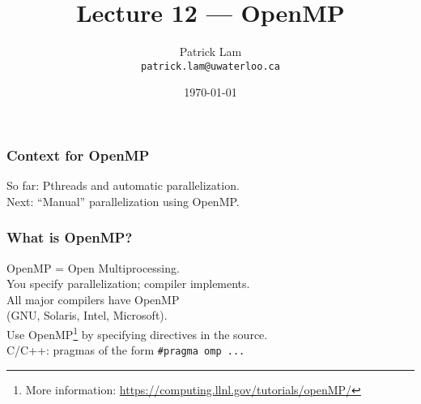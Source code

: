 

\title{Lecture 12 --- OpenMP }

\author{Patrick Lam \\ \small \texttt{patrick.lam@uwaterloo.ca}}
\date{\today}




\begin{frame}
  \titlepage

 \end{frame}

\begin{frame}[containsverbatim]
  \frametitle{Context for OpenMP}

  
    So far: Pthreads and automatic parallelization.\\[1em]
    Next: ``Manual'' parallelization using OpenMP.
  
\end{frame}

\begin{frame}[containsverbatim]
  \frametitle{What is OpenMP?}

  
    OpenMP = Open Multiprocessing.\\[2em]
    You specify parallelization; compiler implements.\\[1em]
    All major compilers have OpenMP \\
    \qquad (GNU, Solaris,
      Intel, Microsoft).\\[1em]

  Use OpenMP\footnote{More information:
    \url{https://computing.llnl.gov/tutorials/openMP/}} by specifying
  directives in the source. \\[1em]
  C/C++: pragmas of the
  form \verb+#pragma omp ...+
  
\end{frame}

